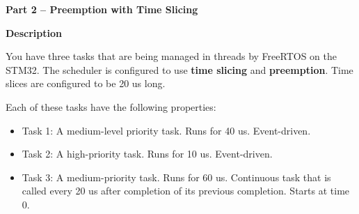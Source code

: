 \documentclass[11pt]{article}
\newcommand{\taskbar}[4]{%
  \draw[fill=#4, draw=black!55] (#1,#3-0.32) rectangle (#2,#3+0.32);
}
\newcommand{\schedAxis}{%
  \foreach \t in {0,10,...,230} {
    \draw[gray!55, dash pattern=on 2pt off 2pt] (\t/10,0) -- (\t/10,4.6);
    \node[below, font=\scriptsize, gray!70] at (\t/10,0) {\t};
  }
  \node[anchor=east, font=\scriptsize, gray!70] at (-0.2,-0.5) {Time (us):};
  \node[anchor=east, font=\large] at (-0.3,4) {Task 1:};
  \node[anchor=east, font=\large] at (-0.3,3) {Task 2:};
  \node[anchor=east, font=\large] at (-0.3,2) {Task 3:};
  \node[anchor=east, font=\large] at (-0.3,1) {Idle:};
}
\begin{document}
\newpage
\textbf{Part 2 -- Preemption with Time Slicing}

\smallskip
\textbf{Description}

\smallskip
You have three tasks that are being managed in threads by FreeRTOS on the
STM32. The scheduler is configured to use \textbf{time slicing} and
\textbf{preemption}. Time slices are configured to be 20 us long.

\smallskip
Each of these tasks have the following properties:
\begin{itemize}
  \item Task 1: A medium-level priority task. Runs for 40 us. Event-driven.
  \item Task 2: A high-priority task. Runs for 10 us. Event-driven.
  \item Task 3: A medium-priority task. Runs for 60 us. Continuous task that
    is called every 20 us after completion of its previous completion.
    Starts at time 0.
\end{itemize}

\bigskip
\begin{center}
\end{center}
\end{document}
